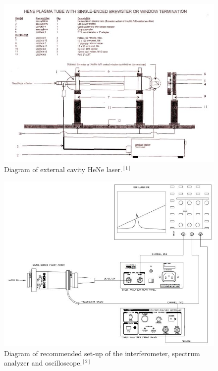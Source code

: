 \documentclass{article}
\begin{document}
\begin{figure}[H]
\includegraphics[scale=0.6,center]{Laser.JPG}
\caption{Diagram of external cavity HeNe laser.$^{[1]}$}
\end{figure}

\begin{figure}[H]
\includegraphics[scale=0.6,center]{Interferometer.JPG}
\caption{Diagram of recommended set-up of the interferometer, spectrum analyzer and oscilloscope.$^{[2]}$}
\end{figure}
\end{document}
